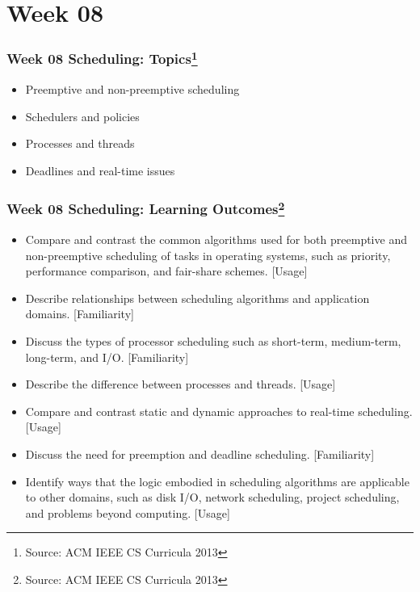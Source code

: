 
\section{Week 08}
\begin{frame}[fragile]
\frametitle{Week 08 Scheduling:
Topics\footnote{Source: ACM IEEE CS Curricula 2013}}

\begin{itemize}
\item Preemptive and non-preemptive scheduling 
\item Schedulers and policies
\item Processes and threads
\item Deadlines and real-time issues
\end{itemize}
\end{frame}

\begin{frame}[fragile]
\frametitle{Week 08 Scheduling:
Learning Outcomes\footnote{Source: ACM IEEE CS Curricula 2013}}
\begin{itemize}
\item Compare and contrast the common algorithms used for both preemptive and non-preemptive scheduling of tasks in operating systems, such as priority, performance comparison, and fair-share schemes. [Usage]
\item Describe relationships between scheduling algorithms and application domains. [Familiarity]
\item Discuss the types of processor scheduling such as short-term, medium-term, long-term, and I/O.  [Familiarity]
\item Describe the difference between processes and threads. [Usage]
\item Compare and contrast static and dynamic approaches to real-time scheduling. [Usage]
\item Discuss the need for preemption and deadline scheduling. [Familiarity]
\item Identify ways that the logic embodied in scheduling algorithms are applicable to other domains, such as disk I/O, network scheduling, project scheduling, and problems beyond computing. [Usage]
\end{itemize}

\end{frame}

